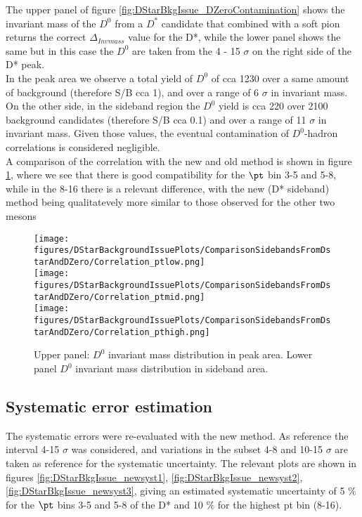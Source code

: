 The upper panel of figure \ref{fig:DStarBkgIssue_DZeroContamination} shows the invariant mass of the $D^{0}$ from a $D^{*}$ candidate that combined with a soft pion returns the correct $\Delta_{Inv mass} $ value for the D*, while the lower panel shows the same but in this case the $D^{0}$ are taken from the 4 - 15 $\sigma$ on the right side of the D* peak.\ \\
In the peak area we observe a total yield of $D^{0}$ of cca 1230 over a same amount of background (therefore S/B cca 1), and over a range of 6 $\sigma$ in invariant mass. On the other side, in the sideband region the $D^{0}$ yield is cca 220 over 2100 background candidates (therefore S/B cca 0.1) and over a range of 11 $\sigma$ in invariant mass. Given those values, the eventual contamination of $D^{0}$-hadron correlations is considered negligible.\ \\ 
A comparison of the correlation with the new and old method is shown in figure \ref{fig:DStarBkgIssue_comapreolttonew}, where we see that there is good compatibility for the $\pt$ bin 3-5 and 5-8, while in the 8-16 there is a relevant difference, with the new (D* sideband) method being qualitatevely more similar to those observed for the other two mesons

\begin{figure}
\centering
{\texttt{[image: figures/DStarBackgroundIssuePlots/ComparisonSidebandsFromDstarAndDZero/Correlation\_ptlow.png]}}\\
{\texttt{[image: figures/DStarBackgroundIssuePlots/ComparisonSidebandsFromDstarAndDZero/Correlation\_ptmid.png]}}\\
{\texttt{[image: figures/DStarBackgroundIssuePlots/ComparisonSidebandsFromDstarAndDZero/Correlation\_pthigh.png]}}\\

\caption{Upper panel: $D^{0}$ invariant mass distribution in peak area. Lower panel $D^{0}$ invariant mass distribution in sideband area.} 
\label{fig:DStarBkgIssue_comapreolttonew}
\end{figure}

\subsection{Systematic error estimation}
The systematic errors were re-evaluated with the new method. As reference the interval 4-15 $\sigma$ was considered, and variations in the subset 4-8 and 10-15 $\sigma$ are taken as reference for the systematic uncertainty. The relevant plots are shown in figures \ref{fig:DStarBkgIssue_newsyst1}, \ref{fig:DStarBkgIssue_newsyst2}, \ref{fig:DStarBkgIssue_newsyst3}, giving an estimated systematic uncertainty of 5 $\%$ for the $\pt$ bins 3-5 and 5-8 of the D* and 10 $\%$ for the highest pt bin (8-16).

